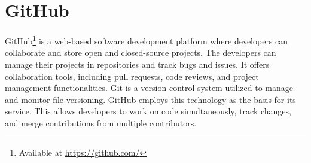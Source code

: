 \section{GitHub}
GitHub\footnote{Available at \url{https://github.com/}} is a web-based software development platform where developers can collaborate and store open and closed-source projects. The developers can manage their projects in repositories and track bugs and issues. It offers collaboration tools, including pull requests, code reviews, and project management functionalities. Git is a version control system utilized to manage and monitor file versioning. GitHub employs this technology as the basis for its service. This allows developers to work on code simultaneously, track changes, and merge contributions from multiple contributors.\cite{github}
